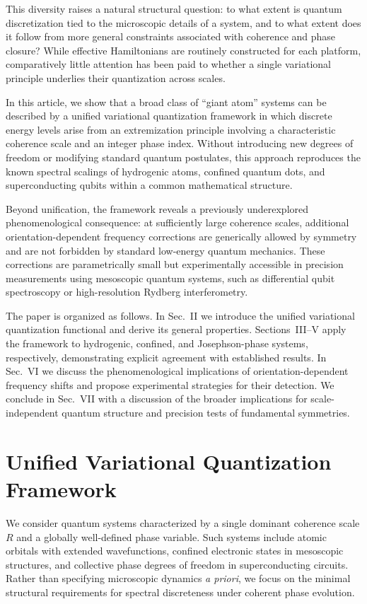 \documentclass[11pt]{article}
\begin{document}
        This diversity raises a natural structural question: to what extent is quantum discretization tied to the microscopic details of a system, and to what extent does it follow from more general constraints associated with coherence and phase closure? While effective Hamiltonians are routinely constructed for each platform, comparatively little attention has been paid to whether a single variational principle underlies their quantization across scales.

        In this article, we show that a broad class of ``giant atom'' systems can be described by a unified variational quantization framework in which discrete energy levels arise from an extremization principle involving a characteristic coherence scale and an integer phase index. Without introducing new degrees of freedom or modifying standard quantum postulates, this approach reproduces the known spectral scalings of hydrogenic atoms, confined quantum dots, and superconducting qubits within a common mathematical structure.

        Beyond unification, the framework reveals a previously underexplored phenomenological consequence: at sufficiently large coherence scales, additional orientation-dependent frequency corrections are generically allowed by symmetry and are not forbidden by standard low-energy quantum mechanics. These corrections are parametrically small but experimentally accessible in precision measurements using mesoscopic quantum systems, such as differential qubit spectroscopy or high-resolution Rydberg interferometry.

        The paper is organized as follows. In Sec.~II we introduce the unified variational quantization functional and derive its general properties. Sections~III--V apply the framework to hydrogenic, confined, and Josephson-phase systems, respectively, demonstrating explicit agreement with established results. In Sec.~VI we discuss the phenomenological implications of orientation-dependent frequency shifts and propose experimental strategies for their detection. We conclude in Sec.~VII with a discussion of the broader implications for scale-independent quantum structure and precision tests of fundamental symmetries.

    \section{Unified Variational Quantization Framework}

        We consider quantum systems characterized by a single dominant coherence scale $R$ and a globally well-defined phase variable. Such systems include atomic orbitals with extended wavefunctions, confined electronic states in mesoscopic structures, and collective phase degrees of freedom in superconducting circuits. Rather than specifying microscopic dynamics \emph{a priori}, we focus on the minimal structural requirements for spectral discreteness under coherent phase evolution.
\end{document}
